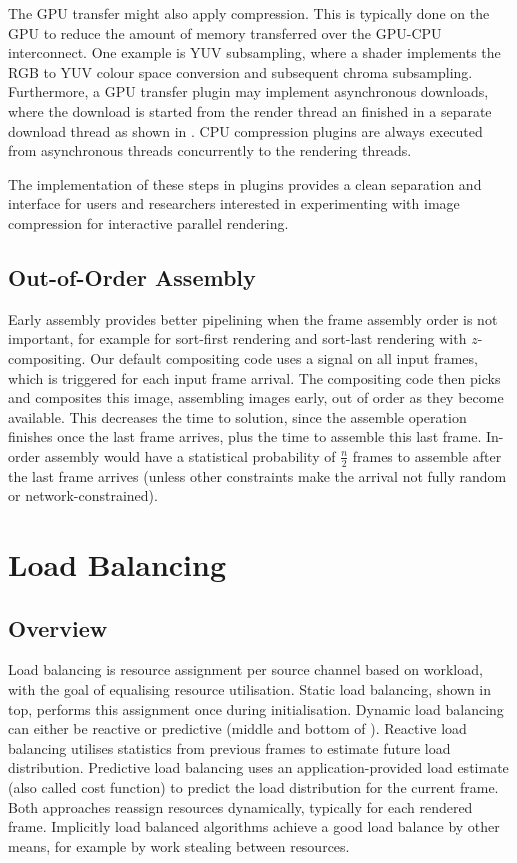 The GPU transfer might also apply compression. This is typically done on the
GPU to reduce the amount of memory transferred over the GPU-CPU interconnect.
One example is YUV subsampling, where a shader implements the RGB to YUV colour
space conversion and subsequent chroma subsampling. Furthermore, a GPU transfer
plugin may implement asynchronous downloads, where the download is started
from the render thread an finished in a separate download thread as shown in
. CPU compression plugins are always executed from asynchronous
threads concurrently to the rendering threads.

The implementation of these steps in plugins provides a clean separation and
interface for users and researchers interested in experimenting with image
compression for interactive parallel rendering.

\section{Out-of-Order Assembly}\label{sEarlyAss}

Early assembly provides better pipelining when the frame assembly order is not
important, for example for sort-first rendering and sort-last rendering with
$z$-compositing. Our default compositing code uses a signal on all input
frames, which is triggered for each input frame arrival. The compositing code
then picks and composites this image, assembling images early, out of order as
they become available. This decreases the time to solution, since the assemble
operation finishes once the last frame arrives, plus the time to assemble this
last frame. In-order assembly would have a statistical probability of
$\frac{n}{2}$ frames to assemble after the last frame arrives (unless other
constraints make the arrival not fully random or network-constrained).

\chapter{Load Balancing}\label{sLoadBalancing}

\section{Overview}

Load balancing is resource assignment per source channel based on
workload, with the goal of equalising resource utilisation. Static load
balancing, shown in  top, performs this assignment once
during initialisation. Dynamic load balancing can either be reactive or
predictive (middle and bottom of ). Reactive load balancing
utilises statistics from previous frames to estimate future load distribution.
Predictive load balancing uses an application-provided load estimate (also
called cost function) to predict the load distribution for the current frame.
Both approaches reassign resources dynamically, typically for each rendered
frame. Implicitly load balanced algorithms achieve a good load balance by other
means, for example by work stealing between resources.

